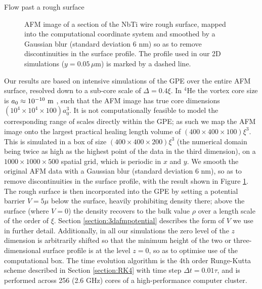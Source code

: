 \begin{chapter}{\label{cha:afm}Flow past a rough surface}
\begin{figure}
  \centering
  \caption{\label{fig:afmsmooth}AFM image of a section of the NbTi wire rough surface, mapped into the computational coordinate system and smoothed by a Gaussian blur (standard deviation 6 nm) so as to remove discontinuities in the surface profile. The profile used in our 2D simulations ($y=0.05\,\mu$m) is marked by a dashed line.}
\end{figure}

Our results are based on intensive simulations of the GPE over the entire AFM surface, resolved down to a sub-core scale of $\Delta=0.4\xi$. In $^4$He the vortex core size is $a_0 \approx 10^{-10}~\rm m$ \cite{Rayfield1964}, such that the AFM image has true core dimensions $(10^4 \times 10^4 \times 100) a_0^3$.  It is not computationally feasible to model the corresponding range of scales directly within the GPE; as such we map the AFM image onto the largest practical healing length volume of $(400 \times 400 \times 100) \xi^3$.  This is simulated in a box of size $(400 \times 400 \times 200) \xi^3$ (the numerical domain being twice as high as the highest point of the data in the third dimension), on a $1000\times 1000\times 500$ spatial grid, which is periodic in $x$ and $y$.  We smooth the original AFM data with a Gaussian blur (standard deviation 6 nm), so as to remove discontinuities in the surface profile, with the result shown in Figure \ref{fig:afmsmooth}. The rough surface is then incorporated into the GPE by setting a potential barrier $V=5\mu$ below the surface, heavily prohibiting density there; above the surface (where $V=0$) the density recovers to the bulk value $\rho$ over a length scale of the order of $\xi$. Section \ref{section:3dafmpotential} describes the form of $V$ we use in further detail. Additionally, in all our simulations the zero level of the $z$ dimension is arbitrarily shifted so that the minimum height of the two or three-dimensional surface profile is at the level $z=0$, so as to optimise use of the computational box. The time evolution algorithm is the 4th order Runge-Kutta scheme described in Section \ref{section:RK4} with time step $\Delta t=0.01 \tau $, and is performed across 256 (2.6 GHz) cores of a high-performance {computer} cluster.


\end{chapter}
